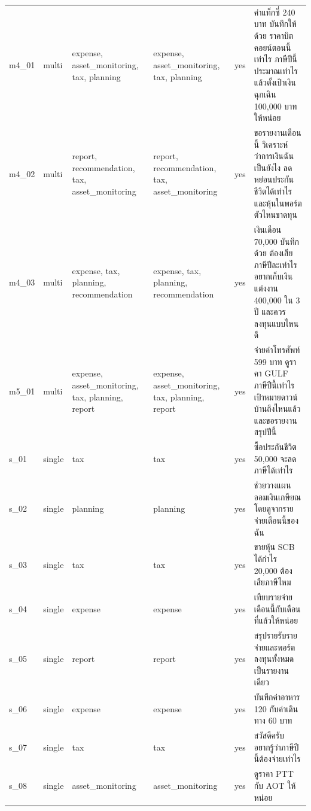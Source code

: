 \documentclass[11pt,a4paper]{article}
\begin{document}
{\begin{longtable}{llp{3.2cm}p{3.2cm}lp{5.3cm}}
m4\_\allowbreak{}01 & multi & expense, asset\_\allowbreak{}monitoring, tax, planning & expense, asset\_\allowbreak{}monitoring, tax, planning & yes & {\thaifont ค่าแท็กซี่ }240 {\thaifont บาท บันทึกให้ด้วย ราคาบิตคอยน์ตอนนี้เท่าไร ภาษีปีนี้ประมาณเท่าไร แล้วตั้งเป้าเงินฉุกเฉิน }100,000 {\thaifont บาทให้หน่อย} \\
m4\_\allowbreak{}02 & multi & report, recommendation, tax, asset\_\allowbreak{}monitoring & report, recommendation, tax, asset\_\allowbreak{}monitoring & yes & {\thaifont ขอรายงานเดือนนี้ วิเคราะห์ว่าการเงินฉันเป็นยังไง ลดหย่อนประกันชีวิตได้เท่าไร และหุ้นในพอร์ตตัวไหนขาดทุน} \\
m4\_\allowbreak{}03 & multi & expense, tax, planning, recommendation & expense, tax, planning, recommendation & yes & {\thaifont เงินเดือน }70,000 {\thaifont บันทึกด้วย ต้องเสียภาษีปีละเท่าไร อยากเก็บเงินแต่งงาน }400,000 {\thaifont ใน }3 {\thaifont ปี และควรลงทุนแบบไหนดี} \\
m5\_\allowbreak{}01 & multi & expense, asset\_\allowbreak{}monitoring, tax, planning, report & expense, asset\_\allowbreak{}monitoring, tax, planning, report & yes & {\thaifont จ่ายค่าโทรศัพท์ }599 {\thaifont บาท ดูราคา }GULF {\thaifont ภาษีปีนี้เท่าไร เป้าหมายดาวน์บ้านถึงไหนแล้ว และขอรายงานสรุปปีนี้} \\
s\_\allowbreak{}01 & single & tax & tax & yes & {\thaifont ซื้อประกันชีวิต }50,000 {\thaifont จะลดภาษีได้เท่าไร} \\
s\_\allowbreak{}02 & single & planning & planning & yes & {\thaifont ช่วยวางแผนออมเงินเกษียณโดยดูจากรายจ่ายเดือนนี้ของฉัน} \\
s\_\allowbreak{}03 & single & tax & tax & yes & {\thaifont ขายหุ้น }SCB {\thaifont ได้กำไร }20,000 {\thaifont ต้องเสียภาษีไหม} \\
s\_\allowbreak{}04 & single & expense & expense & yes & {\thaifont เทียบรายจ่ายเดือนนี้กับเดือนที่แล้วให้หน่อย} \\
s\_\allowbreak{}05 & single & report & report & yes & {\thaifont สรุปรายรับรายจ่ายและพอร์ตลงทุนทั้งหมดเป็นรายงานเดียว} \\
s\_\allowbreak{}06 & single & expense & expense & yes & {\thaifont บันทึกค่าอาหาร }120 {\thaifont กับค่าเดินทาง }60 {\thaifont บาท} \\
s\_\allowbreak{}07 & single & tax & tax & yes & {\thaifont สวัสดีครับ อยากรู้ว่าภาษีปีนี้ต้องจ่ายเท่าไร} \\
s\_\allowbreak{}08 & single & asset\_\allowbreak{}monitoring & asset\_\allowbreak{}monitoring & yes & {\thaifont ดูราคา }PTT {\thaifont กับ }AOT {\thaifont ให้หน่อย} \\
\end{longtable}}
\end{document}
